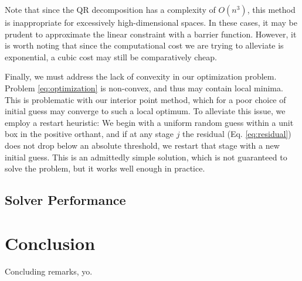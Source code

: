 \documentclass[]{aiaa-tc}%
\begin{document}
Note that since the QR decomposition has a complexity of $O(n^3)$, this method is inappropriate for excessively high-dimensional spaces. In these cases, it may be prudent to approximate the linear constraint with a barrier function. However, it is worth noting that since the computational cost we are trying to alleviate is exponential, a cubic cost may still be comparatively cheap.

Finally, we must address the lack of convexity in our optimization problem. Problem \ref{eq:optimization} is non-convex, and thus may contain local minima. This is problematic with our interior point method, which for a poor choice of initial guess may converge to such a local optimum. To alleviate this issue, we employ a restart heuristic: We begin with a uniform random guess within a unit box in the positive orthant, and if at any stage $j$ the residual (Eq. \ref{eq:residual}) does not drop below an absolute threshold, we restart that stage with a new initial guess. This is an admittedly simple solution, which is not guaranteed to solve the problem, but it works well enough in practice.

\subsection{Solver Performance} \label{sec:solver_performance}




\section{Conclusion} \label{sec:conclusion}

Concluding remarks, yo.



\end{document}
